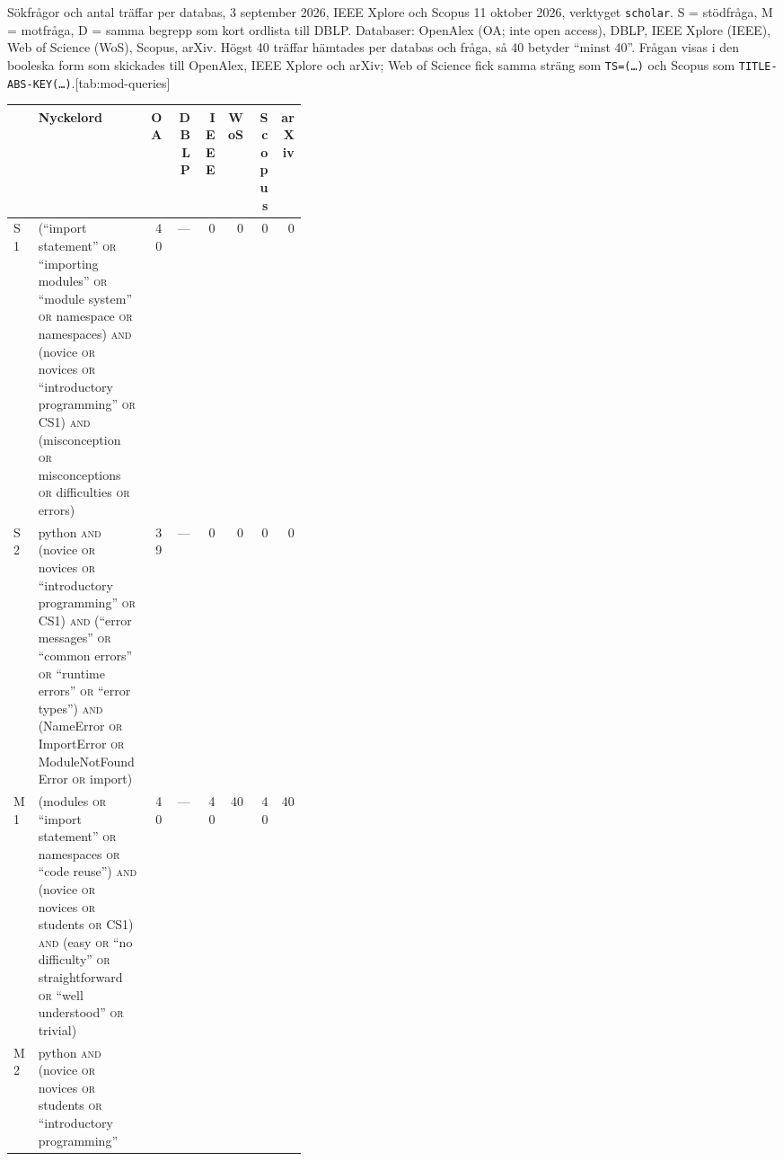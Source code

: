 \begin{table}[!htb]
  \begin{sidecaption}{Sökfrågor och antal träffar per databas, 3
    september 2026, IEEE Xplore och Scopus 11 oktober 2026, verktyget
    \texttt{scholar}.  S = stödfråga,
    M = motfråga, D = samma begrepp som kort ordlista till DBLP.
    Databaser: OpenAlex (OA; inte \foreignlanguage{english}{open
    access}), DBLP, IEEE Xplore (IEEE), Web of Science (WoS), Scopus,
    arXiv.  Högst 40 träffar
    hämtades per databas och fråga, så 40 betyder \enquote{minst 40}.
    Frågan visas i den booleska form som skickades till OpenAlex, IEEE
    Xplore och arXiv; Web of Science fick samma sträng som
    \texttt{TS=(\dots)} och Scopus som
    \texttt{TITLE-ABS-KEY(\dots)}.}[tab:mod-queries]
    \centering\footnotesize
    \begin{tabular}{@{}lp{0.38\linewidth}rrrrrr@{}}
      \toprule
      & Nyckelord & OA & DBLP & IEEE & WoS & Scopus & arXiv \\
      \midrule
      S1 & (\enquote{import statement} \textsc{or} \enquote{importing
        modules} \textsc{or} \enquote{module system} \textsc{or}
        namespace \textsc{or} namespaces) \textsc{and} (novice
        \textsc{or} novices \textsc{or} \enquote{introductory
        programming} \textsc{or} CS1) \textsc{and} (misconception
        \textsc{or} misconceptions \textsc{or} difficulties \textsc{or}
        errors)
        & 40 & --- & 0 & 0 & 0 & 0 \\
      S2 & python \textsc{and} (novice \textsc{or} novices \textsc{or}
        \enquote{introductory programming} \textsc{or} CS1) \textsc{and}
        (\enquote{error messages} \textsc{or} \enquote{common errors}
        \textsc{or} \enquote{runtime errors} \textsc{or} \enquote{error
        types}) \textsc{and} (NameError \textsc{or} ImportError
        \textsc{or} ModuleNotFoundError \textsc{or} import)
        & 39 & --- & 0 & 0 & 0 & 0 \\
      M1 & (modules \textsc{or} \enquote{import statement} \textsc{or}
        namespaces \textsc{or} \enquote{code reuse}) \textsc{and}
        (novice \textsc{or} novices \textsc{or} students \textsc{or}
        CS1) \textsc{and} (easy \textsc{or} \enquote{no difficulty}
        \textsc{or} straightforward \textsc{or} \enquote{well
        understood} \textsc{or} trivial)
        & 40 & --- & 40 & 40 & 40 & 40 \\
      M2 & python \textsc{and} (novice \textsc{or} novices \textsc{or}
        students \textsc{or} \enquote{introductory programming}

\end{tabular}
\end{sidecaption}
\end{table}
